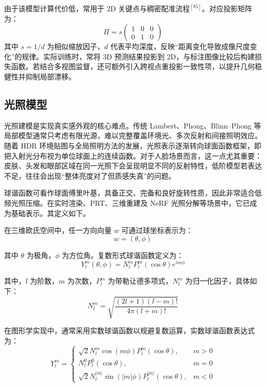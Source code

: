 由于该模型计算代价低，常用于 2D 关键点与稠密配准流程\(^{[85]}\)。对应投影矩阵为：
\begin{equation}
\Pi = s
\begin{pmatrix}
1 & 0 & 0 \\
0 & 1 & 0
\end{pmatrix}
\end{equation}
其中 \(s = 1/d\) 为相似缩放因子，\(d\) 代表平均深度，反映“距离变化导致成像尺度变化”的规律。实际训练时，常将 3D 预测结果投影到 2D，与标注图像比较后构建损失函数。若结合多视图监督，还可额外引入跨视点重投影一致性项，以提升几何稳健性并抑制局部漂移。
\subsection{光照模型}


光照建模是实现真实感外观的核心难点。传统 Lambert、Phong、Blinn--Phong 等局部模型通常只考虑有限光源，难以完整覆盖环境光、多次反射和间接照明效应\cite{Phong1975,Blinn1977}。随着 HDR 环境贴图与全局照明方法的发展\cite{Debevec1997}，光照表示逐渐转向球面函数框架，即把入射光分布视为单位球面上的连续函数\cite{Ramamoorthi2001}。对于人脸场景而言，这一点尤其重要：皮肤、头发和眼部区域在同一光照下会呈现明显不同的反射特性，低阶模型若表达不足，往往会出现“整体亮度对了但质感失真”的问题。

球谐函数可看作球面傅里叶基，具备正交、完备和良好旋转性质\cite{Morse1953}，因此非常适合低频光照压缩。在实时渲染、PRT\cite{Sloan2002}、三维重建及 NeRF 光照分解等场景中，它已成为基础表示。其定义如下。

在三维欧氏空间中，任一方向向量 $w$ 可通过球坐标表示为：
\begin{equation}  %
w = (\theta, \phi)
\label{eq:2-8}
\end{equation}

其中 $\theta$ 为极角，$\phi$ 为方位角。复数形式球谐函数定义为：
\begin{equation}
Y_l^m(\theta, \phi) = N_l^m P_l^m(\cos \theta) e^{im\phi}
\end{equation}

其中，$l$ 为阶数，$m$ 为次数，$P_l^m$ 为带勒让德多项式，$N_l^m$ 为归一化因子，具体如下：
\begin{equation}
N_l^m = \sqrt{\frac{(2l+1)(l-m)!}{4\pi(l+m)!}}
\end{equation}

在图形学实现中，通常采用实数球谐函数以规避复数运算，实数球谐函数表达式为：
\begin{equation}
Y_l^{m} =
\begin{cases}
\sqrt{2}N_l^{m}\cos(m\phi)P_l^{m}(\cos\theta), & m > 0 \\
N_l^{0}P_l^{0}(\cos\theta), & m = 0 \\
\sqrt{2}N_l^{|m|}\sin(|m|\phi)P_l^{|m|}(\cos\theta), & m < 0
\end{cases}
\end{equation}

